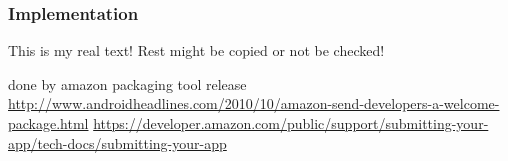 \subsubsection{Implementation}\label{subsection:license-amazon-implementation}
This is my real text! Rest might be copied or not be checked!

done by amazon packaging tool\newline
release \url{http://www.androidheadlines.com/2010/10/amazon-send-developers-a-welcome-package.html}\newline
\url{https://developer.amazon.com/public/support/submitting-your-app/tech-docs/submitting-your-app}
